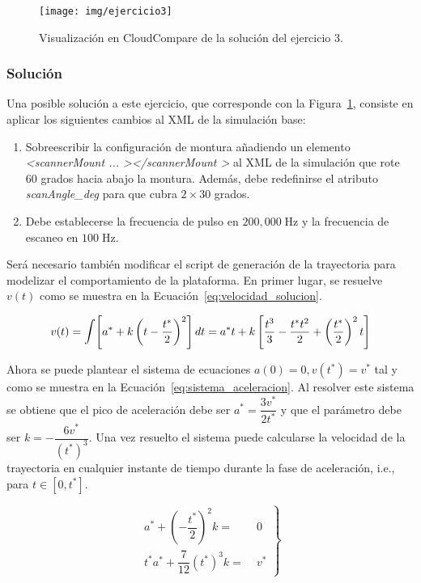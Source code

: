 \documentclass[]{article}
\begin{document}
	\begin{figure}[htb]
		\centering
		\texttt{[image: img/ejercicio3]}
		\caption{Visualización en CloudCompare de la solución del ejercicio 3.}
		\label{fig:ejercicio3}
	\end{figure} 

	
	\pagebreak

	\subsubsection*{Solución}
	Una posible solución a este ejercicio, que corresponde con la Figura~\ref{fig:ejercicio3}, consiste en aplicar los siguientes cambios al XML de la simulación base:
	
	\begin{enumerate}
		\item Sobreescribir la configuración de montura añadiendo un elemento \textit{\textless scannerMount ... \textgreater \textless /scannerMount \textgreater} al XML de la simulación que rote $60$ grados hacia abajo la montura. Además, debe redefinirse el atributo \textit{scanAngle\_deg} para que cubra $2 \times 30$ grados.
		\item Debe establecerse la frecuencia de pulso en $200,000\;\text{Hz}$ y la frecuencia de escaneo en $100\;\text{Hz}$.
	\end{enumerate}

	Será necesario también modificar el script de generación de la trayectoria para modelizar el comportamiento de la plataforma. En primer lugar, se resuelve $v(t)$ como se muestra en la Ecuación~\ref{eq:velocidad_solucion}.
	
	\begin{equation}
		v(t) = \mathlarger{\int}{\left[a^* + k\left(t-\dfrac{t^*}{2}\right)^2\right] dt} =
			a^*t + k\left[
			\dfrac{t^3}{3} - \dfrac{t^*t^2}{2} + \left(\dfrac{t^*}{2}\right)^2t
		\right]
		\label{eq:velocidad_solucion}
	\end{equation}

	Ahora se puede plantear el sistema de ecuaciones $a(0)=0, v(t^*) = v^*$ tal y como se muestra en la Ecuación~\ref{eq:sistema_aceleracion}. Al resolver este sistema se obtiene que el pico de aceleración debe ser $a^* = \dfrac{3v^*}{2t^*}$ y que el parámetro debe ser $k=-\dfrac{6v^*}{(t^*)^3}$. Una vez resuelto el sistema puede calcularse la velocidad de la trayectoria en cualquier instante de tiempo durante la fase de aceleración, i.e., para $t \in [0, t^*]$.
	
	\begin{equation}
		\left.\begin{split}
			a^* + \left(-\dfrac{t^*}{2}\right)^2 k =&\; 0 \\
			t^* a^* + \dfrac{7}{12} (t^*)^3 k =&\; v^*
		\end{split}\right\}
	\label{eq:sistema_aceleracion}
	\end{equation}
\end{document}
